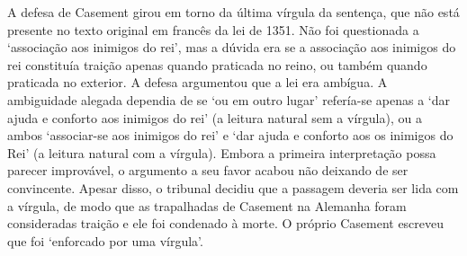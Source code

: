 A defesa de Casement girou em torno da última vírgula da sentença, que não está presente no texto original em francês da lei de 1351. Não foi questionada a `associação aos inimigos do rei', mas a dúvida era se a associação aos inimigos do rei constituía traição apenas quando praticada no reino, ou também quando praticada no exterior. A defesa argumentou que a lei era ambígua. A ambiguidade alegada dependia de se `ou em outro lugar' refería-se apenas a `dar ajuda e conforto aos inimigos do rei' (a leitura natural sem a vírgula), ou a ambos `associar-se aos inimigos do rei' e `dar ajuda e conforto aos os inimigos do Rei' (a leitura natural com a vírgula). Embora a primeira interpretação possa parecer improvável, o argumento a seu favor acabou não deixando de ser convincente. Apesar disso, o tribunal decidiu que a passagem deveria ser lida com a vírgula, de modo que as trapalhadas de Casement na Alemanha foram consideradas traição e ele foi condenado à morte. O próprio Casement escreveu que foi `enforcado por uma vírgula'.


